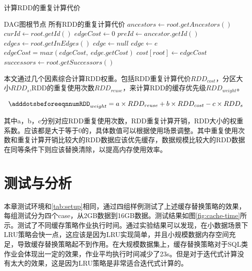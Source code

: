 \begin{algorithm}  
    \caption{计算RDD的重复计算代价}  
    \begin{algorithmic}[1] %
        \Require DAG图根节点
        \Ensure 所有RDD的重复计算代价
            \State $ancestors \gets root.getAncestors()$
            \State $curId \gets root.getId()$
            \State $edgeCost \gets 0$
                \State $preId \gets ancestor.getId()$
                \State $edges \gets root.getInEdges()$
                \State $edge \gets null$
                        \State $edge \gets e$
                    \EndIf
                \EndFor
                \State $edgeCost = max(edgeCost, \ edge.getCost)$
            \EndFor
            \State $cost[root] \gets edgeCost$
            \State $successors \gets root.getSuccessors()$
                \State {}
            \EndFor
        \EndFunction
    \end{algorithmic}
    \label{alg:rdd-cost}
\end{algorithm}

本文通过几个因素综合计算RDD权重。包括RDD重复计算代价$RDD_{cost}$，分区大小$RDD_s$,RDD的重复使用次数$RDD_{reuse}$，来计算RDD的缓存优先级$RDD_{weight}$。

\begin{equation} \label{eq:weight}
    \adddotsbeforeeqnnum%
    RDD_{weight}=a \times RDD_{reuse} + b \times RDD_{cost} - c \times RDD_{s}
\end{equation}

其中a，b，c分别对应RDD重复使用次数，RDD重复计算开销，RDD大小的权重系数。应该都是大于等于0的，具体数值可以根据使用场景调整。其中重复使用次数和重复计算开销比较大的RDD数据应该优先缓存，数据规模比较大的RDD数据在同等条件下则应该替换清除，以提高内存使用效率。

\section{测试与分析}

本章测试环境和\ref{tab:setup}相同，通过四组样例测试了上述缓存替换策略的效果，每组测试分为四个case，从2GB数据到16GB数据。测试结果如图\ref{fig:cache-time}所示。测试了不同缓存策略作业执行时间。通过实验结果可以发现，在小数据场景下LRU策略会快一点，这应该是因为LRU实现简单，并且小规模数据内存空间充足，导致缓存替换策略起不到作用。在大规模数据集上，缓存替换策略对于SQL类作业会体现出一定的效果，作业平均执行时间减少了23s。但是对于迭代式计算没有太大的效果，这是因为LRU策略是非常适合迭代式计算的。


